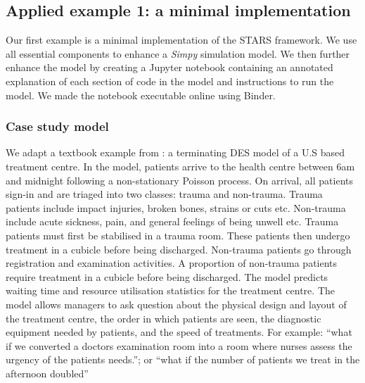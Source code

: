 \documentclass[]{interact}
\theoremstyle{plain}%
\theoremstyle{definition}
\theoremstyle{remark}
\begin{document}


\subsection{Applied example 1: a minimal implementation}

Our first example is a minimal implementation of the STARS framework. We use all essential components to enhance a \textit{Simpy} simulation model. We then further enhance the model by creating a Jupyter notebook containing an annotated explanation of each section of code in the model and instructions to run the model. We made the notebook executable online using Binder.  

\subsubsection{Case study model}

We adapt a textbook example from \citet[p.170]{nelson2013}: a terminating DES model of a U.S based treatment centre. In the model, patients arrive to the health centre between 6am and {\color{red}midnight} following a non-stationary Poisson process. On arrival, all patients sign-in and are triaged into two classes: trauma and non-trauma. Trauma patients include impact injuries, broken bones, strains or cuts etc. Non-trauma include acute sickness, pain, and general feelings of being unwell etc. Trauma patients must first be stabilised in a trauma room. These patients then undergo treatment in a cubicle before being discharged. Non-trauma patients go through registration and examination activities. A proportion of non-trauma patients require treatment in a cubicle before being discharged. The model predicts waiting time and resource utilisation statistics for the treatment centre. The model allows managers to ask question about the physical design and layout of the treatment centre, the order in which patients are seen, the diagnostic equipment needed by patients, and the speed of treatments. For example: “what if we converted a doctors examination room into a room where nurses assess the urgency of the patients needs.”; or “what if the number of patients we treat in the afternoon doubled”
\end{document}
